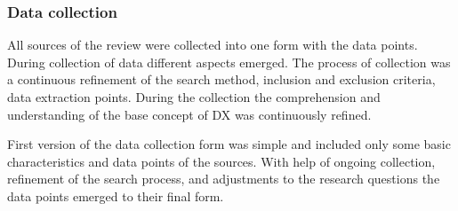 \documentclass[english, 12pt, a4paper, sci, utf8, a-1b, online]{aaltothesis}
\begin{document}
\subsubsection{Data collection}

All sources of the review were collected into one form with the data points. During collection of data different aspects emerged. The process of collection was a continuous refinement of the search method, inclusion and exclusion criteria, data extraction points. During the collection the comprehension and understanding of the base concept of DX was continuously refined.

First version of the data collection form was simple and included only some basic characteristics and data points of the sources. With help of ongoing collection, refinement of the search process, and adjustments to the research questions the data points emerged to their final form.

\end{document}
